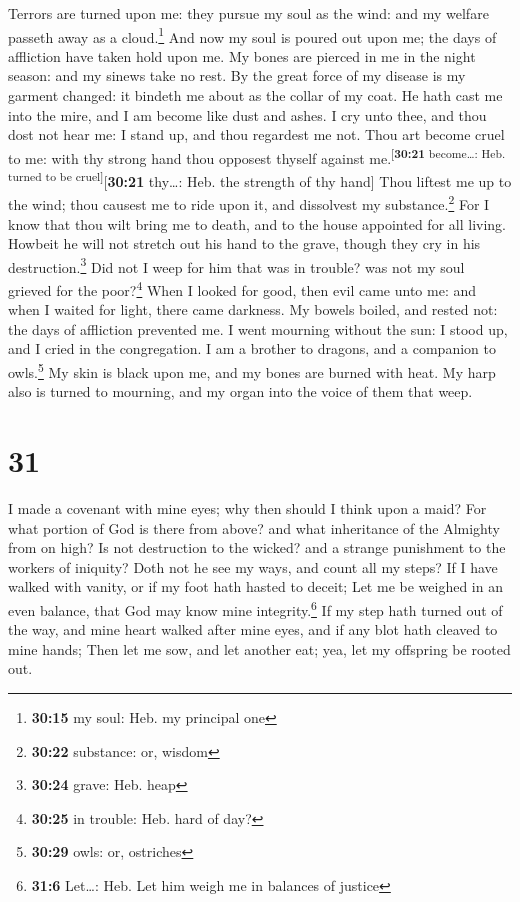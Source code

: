  Terrors are turned upon me: they pursue my soul as the
wind: and my welfare passeth away as a cloud.\footnote{\textbf{30:15} my
  soul: Heb. my principal one}  And now my soul is poured
out upon me; the days of affliction have taken hold upon me.
 My bones are pierced in me in the night season: and my
sinews take no rest.  By the great force of my disease is
my garment changed: it bindeth me about as the collar of my coat.
 He hath cast me into the mire, and I am become like dust
and ashes.  I cry unto thee, and thou dost not hear me: I
stand up, and thou regardest me not.  Thou art become
cruel to me: with thy strong hand thou opposest thyself against
me.\textsuperscript{{[}\textbf{30:21} become\ldots: Heb. turned to be
cruel{]}}{[}\textbf{30:21} thy\ldots: Heb. the strength of thy hand{]}
 Thou liftest me up to the wind; thou causest me to ride
upon it, and dissolvest my substance.\footnote{\textbf{30:22} substance:
  or, wisdom}  For I know that thou wilt bring me to
death, and to the house appointed for all living. 
Howbeit he will not stretch out his hand to the grave, though they cry
in his destruction.\footnote{\textbf{30:24} grave: Heb. heap}
 Did not I weep for him that was in trouble? was not my
soul grieved for the poor?\footnote{\textbf{30:25} in trouble: Heb. hard
  of day?}  When I looked for good, then evil came unto
me: and when I waited for light, there came darkness.  My
bowels boiled, and rested not: the days of affliction prevented me.
 I went mourning without the sun: I stood up, and I cried
in the congregation.  I am a brother to dragons, and a
companion to owls.\footnote{\textbf{30:29} owls: or, ostriches}
 My skin is black upon me, and my bones are burned with
heat.  My harp also is turned to mourning, and my organ
into the voice of them that weep.

\hypertarget{section-30}{%
\section{31}\label{section-30}}

 I made a covenant with mine eyes; why then should I think
upon a maid?  For what portion of God is there from above?
and what inheritance of the Almighty from on high?  Is not
destruction to the wicked? and a strange punishment to the workers of
iniquity?  Doth not he see my ways, and count all my
steps?  If I have walked with vanity, or if my foot hath
hasted to deceit;  Let me be weighed in an even balance,
that God may know mine integrity.\footnote{\textbf{31:6} Let\ldots: Heb.
  Let him weigh me in balances of justice}  If my step
hath turned out of the way, and mine heart walked after mine eyes, and
if any blot hath cleaved to mine hands;  Then let me sow,
and let another eat; yea, let my offspring be rooted out.

